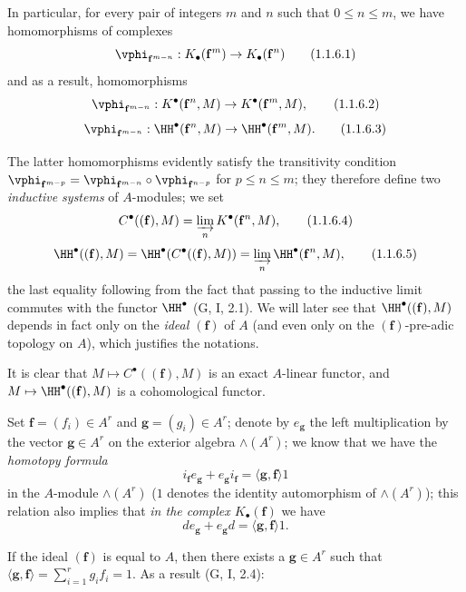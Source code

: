 \begin{env}[1.1.6]
\label{III.1.1.6}
In particular, for every pair of integers $m$ and $n$ such that $0\leq n\leq m$, we have homomorphisms of complexes
\[
  \vphi_{\mathbf{f}^{m-n}}:K_\bullet(\mathbf{f}^m)\to K_\bullet(\mathbf{f}^n)
  \tag{1.1.6.1}
\]
and as a result, homomorphisms
\[
  \vphi_{\mathbf{f}^{m-n}}:K^\bullet(\mathbf{f}^n,M)\to K^\bullet(\mathbf{f}^m,M),
  \tag{1.1.6.2}
\]
\[
  \vphi_{\mathbf{f}^{m-n}}:\HH^\bullet(\mathbf{f}^n,M)\to\HH^\bullet(\mathbf{f}^m,M).
  \tag{1.1.6.3}
\]

The latter homomorphisms evidently satisfy the transitivity condition $\vphi_{\mathbf{f}^{m-p}}=\vphi_{\mathbf{f}^{m-n}}\circ\vphi_{\mathbf{f}^{n-p}}$ for $p\leq n\leq m$; they therefore define two \emph{inductive systems} of $A$-modules; we set
\[
  C^\bullet((\mathbf{f}),M)=\varinjlim_n K^\bullet(\mathbf{f}^n,M),
  \tag{1.1.6.4}
\]
\[
  \HH^\bullet((\mathbf{f}),M)=\HH^\bullet(C^\bullet((\mathbf{f}),M))=\varinjlim_n\HH^\bullet(\mathbf{f}^n,M),
  \tag{1.1.6.5}
\]
the last equality following from the fact that passing to the inductive limit commutes with the functor $\HH^\bullet$ (G, I, 2.1).
We will later see  that $\HH^\bullet((\mathbf{f}),M)$ depends in fact only on the \emph{ideal $(\mathbf{f})$} of $A$ (and even only on the $(\mathbf{f})$-pre-adic topology on $A$), which justifies the notations.

It is clear that $M\mapsto C^\bullet((\mathbf{f}),M)$ is an exact $A$-linear functor, and $M\mapsto\HH^\bullet((\mathbf{f}),M)$ is a cohomological functor.
\end{env}

\begin{env}[1.1.7]
\label{III.1.1.7}
Set $\mathbf{f}=(f_i)\in A^r$ and $\mathbf{g}=(g_i)\in A^r$; denote by $e_\mathbf{g}$ the left multiplication by the vector $\mathbf{g}\in A^r$ on the exterior algebra $\wedge(A^r)$; we know that we have the \emph{homotopy formula}
\[
  i_\mathbf{f}e_\mathbf{g}+e_\mathbf{g}i_\mathbf{f}=\langle\mathbf{g},\mathbf{f}\rangle 1
  \tag{1.1.7.1}
\]
in the $A$-module $\wedge(A^r)$ ($1$ denotes the identity automorphism of $\wedge(A^r)$); this relation also implies that \emph{in the complex $K_\bullet(\mathbf{f})$} we have
\[
  de_\mathbf{g}+e_\mathbf{g}d=\langle\mathbf{g},\mathbf{f}\rangle 1.
  \tag{1.1.7.2}
\]

If the ideal $(\mathbf{f})$ is equal to $A$, then there exists a $\mathbf{g}\in A^r$ such that $\langle\mathbf{g},\mathbf{f}\rangle=\sum_{i=1}^r g_i f_i=1$.
As a result (G, I, 2.4):
\end{env}

